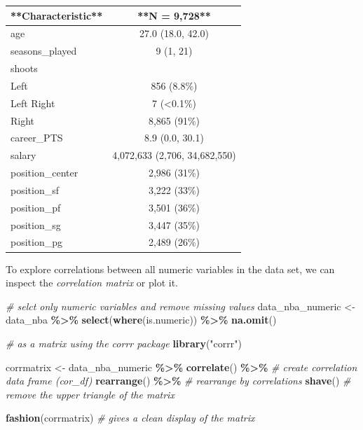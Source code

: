 \documentclass[
]{book}
\newenvironment{Shaded}{\begin{snugshade}}{\end{snugshade}}
\newcommand{\CommentTok}[1]{\textcolor[rgb]{0.56,0.35,0.01}{\textit{#1}}}
\newcommand{\FunctionTok}[1]{\textcolor[rgb]{0.13,0.29,0.53}{\textbf{#1}}}
\newcommand{\NormalTok}[1]{#1}
\newcommand{\OtherTok}[1]{\textcolor[rgb]{0.56,0.35,0.01}{#1}}
\newcommand{\SpecialCharTok}[1]{\textcolor[rgb]{0.81,0.36,0.00}{\textbf{#1}}}
\newcommand{\StringTok}[1]{\textcolor[rgb]{0.31,0.60,0.02}{#1}}
\begin{document}
\begin{tabular}{l|c}
\hline
**Characteristic** & **N = 9,728**\\
\hline
age & 27.0 (18.0, 42.0)\\
\hline
seasons\_played & 9 (1, 21)\\
\hline
shoots & \\
\hline
Left & 856 (8.8\%)\\
\hline
Left Right & 7 (<0.1\%)\\
\hline
Right & 8,865 (91\%)\\
\hline
career\_PTS & 8.9 (0.0, 30.1)\\
\hline
salary & 4,072,633 (2,706, 34,682,550)\\
\hline
position\_center & 2,986 (31\%)\\
\hline
position\_sf & 3,222 (33\%)\\
\hline
position\_pf & 3,501 (36\%)\\
\hline
position\_sg & 3,447 (35\%)\\
\hline
position\_pg & 2,489 (26\%)\\
\hline
\end{tabular}

To explore correlations between all numeric variables in the data set, we can inspect the \emph{correlation matrix} or plot it.

\begin{Shaded}
\begin{Highlighting}[]
\CommentTok{\# selct only numeric variables and remove missing values}
\NormalTok{data\_nba\_numeric }\OtherTok{\textless{}{-}}\NormalTok{ data\_nba }\SpecialCharTok{\%\textgreater{}\%}
  \FunctionTok{select}\NormalTok{(}\FunctionTok{where}\NormalTok{(is.numeric)) }\SpecialCharTok{\%\textgreater{}\%}
  \FunctionTok{na.omit}\NormalTok{()}

\CommentTok{\# as a matrix using the corrr package}
\FunctionTok{library}\NormalTok{(}\StringTok{"corrr"}\NormalTok{)}

\NormalTok{corrmatrix }\OtherTok{\textless{}{-}}\NormalTok{ data\_nba\_numeric }\SpecialCharTok{\%\textgreater{}\%}
  \FunctionTok{correlate}\NormalTok{() }\SpecialCharTok{\%\textgreater{}\%} \CommentTok{\# create correlation data frame (cor\_df)}
  \FunctionTok{rearrange}\NormalTok{() }\SpecialCharTok{\%\textgreater{}\%} \CommentTok{\# rearrange by correlations}
  \FunctionTok{shave}\NormalTok{() }\CommentTok{\# remove the upper triangle of the matrix}

\FunctionTok{fashion}\NormalTok{(corrmatrix) }\CommentTok{\# gives a clean display of the matrix}
\end{Highlighting}
\end{Shaded}
\end{document}
